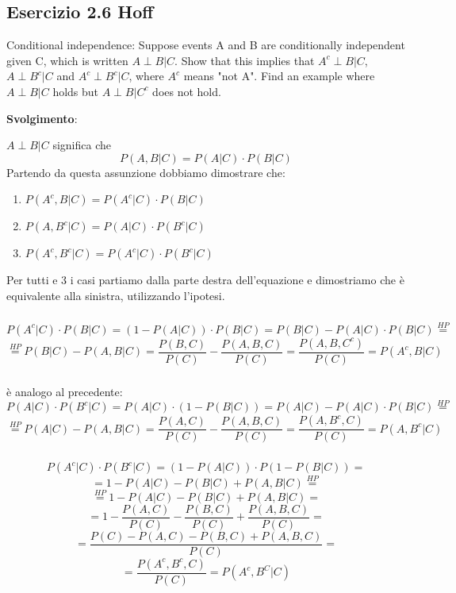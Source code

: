 \subsection{Esercizio 2.6 Hoff}

Conditional independence: Suppose events A and B are conditionally independent given C, which is written $A\perp B|C$. Show that this implies that $A^c\perp B|C$, $A\perp B^c|C$ and $A^c\perp B^c|C$, where $A^c$ means "not A". Find an example where $A\perp B|C$ holds but $A\perp B|C^c$ does not hold.

\textbf{Svolgimento}:
\bigskip

$A\perp B|C$ significa che
$$
	P(A,B|C) = P(A|C)\cdot P(B|C)
$$
Partendo da questa assunzione dobbiamo dimostrare che:
\begin{enumerate}
	\item $P(A^c, B|C) = P(A^c|C)\cdot P(B|C)$
	\item $P(A, B^c|C) = P(A|C)\cdot P(B^c|C)$
	\item $P(A^c, B^c|C) = P(A^c|C)\cdot P(B^c|C)$
\end{enumerate}

Per tutti e 3 i casi partiamo dalla parte destra dell'equazione e dimostriamo che è equivalente alla sinistra, utilizzando l'ipotesi.

\subsubsection{} 
$$
	P(A^c|C)\cdot P(B|C) = (1-P(A|C))\cdot P(B|C) = P(B|C) - P(A|C)\cdot P(B|C) \stackrel{HP}{=} 
$$
$$
	\stackrel{HP}{=} P(B|C) - P(A,B|C) = \frac{P(B,C)}{P(C)} - \frac{P(A,B,C)}{P(C)} = \frac{P(A,B,C^c)}{P(C)} = P(A^c,B|C)
$$

\subsubsection{} 
è analogo al precedente:
$$
	P(A|C)\cdot P(B^c|C) = P(A|C)\cdot (1-P(B|C)) = P(A|C) - P(A|C) \cdot P(B|C)  \stackrel{HP}{=}
$$
$$
	 \stackrel{HP}{=} P(A|C) - P(A,B|C) = \frac{P(A,C)}{P(C)} - \frac{P(A,B,C)}{P(C)} = \frac{P(A,B^c,C)}{P(C)} =P(A,B^c|C)
$$

\subsubsection{}
$$
	P(A^c|C)\cdot P(B^c|C) = (1-P(A|C))\cdot P(1-P(B|C)) =
$$
$$
	= 1 - P(A|C) - P(B|C) + P(A,B|C) \stackrel{HP}{=}
$$
$$
	\stackrel{HP}{=} 1 - P(A|C) - P(B|C) + P(A,B|C) =
$$
$$
	= 1-\frac{P(A,C)}{P(C)} - \frac{P(B,C)}{P(C)} + \frac{P(A,B,C)}{P(C)} = 
$$
$$
	= \frac{P(C)-P(A,C)-P(B,C)+P(A,B,C)}{P(C)} =
$$
$$
 	=\frac{P(A^c,B^c,C)}{P(C)} = P(A^c,B^C|C)
$$